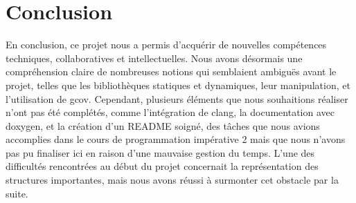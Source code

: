\documentclass[10pt]{article}
\begin{document}
\section*{Conclusion}
En conclusion, ce projet nous a permis d'acquérir de nouvelles compétences techniques, collaboratives et intellectuelles. Nous avons désormais une compréhension claire de nombreuses notions qui semblaient ambiguës avant le projet, telles que les bibliothèques statiques et dynamiques, leur manipulation, et l'utilisation de gcov. Cependant, plusieurs éléments que nous souhaitions réaliser n'ont pas été complétés, comme l'intégration de clang, la documentation avec doxygen, et la création d'un README soigné, des tâches que nous avions accomplies dans le cours de programmation impérative 2 mais que nous n'avons pas pu finaliser ici en raison d'une mauvaise gestion du temps. L'une des difficultés rencontrées au début du projet concernait la représentation des structures importantes, mais nous avons réussi à surmonter cet obstacle par la suite.
\end{document}
